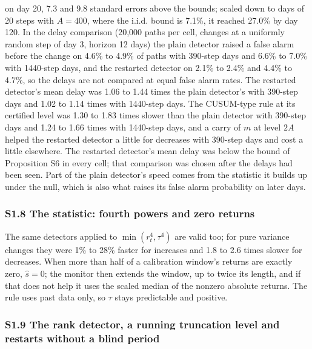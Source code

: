 \documentclass[
]{article}
\begin{document}
on day 20, 7.3 and 9.8 standard errors above the bounds; scaled down to
days of 20 steps with \(A = 400\), where the i.i.d. bound is 7.1\%, it
reached 27.0\% by day 120. In the delay comparison (20,000 paths per
cell, changes at a uniformly random step of day 3, horizon 12 days) the
plain detector raised a false alarm before the change on 4.6\% to 4.9\%
of paths with 390-step days and 6.6\% to 7.0\% with 1440-step days, and
the restarted detector on 2.1\% to 2.4\% and 4.4\% to 4.7\%, so the
delays are not compared at equal false alarm rates. The restarted
detector's mean delay was 1.06 to 1.44 times the plain detector's with
390-step days and 1.02 to 1.14 times with 1440-step days. The CUSUM-type
rule at its certified level was 1.30 to 1.83 times slower than the plain
detector with 390-step days and 1.24 to 1.66 times with 1440-step days,
and a carry of \(m\) at level \(2A\) helped the restarted detector a
little for decreases with 390-step days and cost a little elsewhere. The
restarted detector's mean delay was below the bound of Proposition S6 in
every cell; that comparison was chosen after the delays had been seen.
Part of the plain detector's speed comes from the statistic it builds up
under the null, which is also what raises its false alarm probability on
later days.

\hypertarget{s1.8-the-statistic-fourth-powers-and-zero-returns}{%
\subsubsection{S1.8 The statistic: fourth powers and zero
returns}\label{s1.8-the-statistic-fourth-powers-and-zero-returns}}

The same detectors applied to \(\min(r_t^4, \tau^4)\) are valid too; for
pure variance changes they were 1\% to 28\% faster for increases and 1.8
to 2.6 times slower for decreases. When more than half of a calibration
window's returns are exactly zero, \(\hat s = 0\); the monitor then
extends the window, up to twice its length, and if that does not help it
uses the scaled median of the nonzero absolute returns. The rule uses
past data only, so \(\tau\) stays predictable and positive.

\hypertarget{s1.9-the-rank-detector-a-running-truncation-level-and-restarts-without-a-blind-period}{%
\subsubsection{S1.9 The rank detector, a running truncation level and
restarts without a blind
period}\label{s1.9-the-rank-detector-a-running-truncation-level-and-restarts-without-a-blind-period}}
\end{document}
